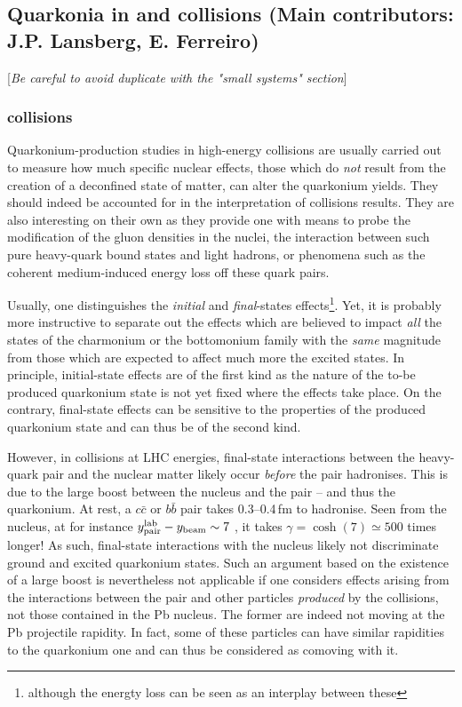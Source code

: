 \documentclass[../report.tex]{subfiles}
\begin{document}

\clearpage

\subsection{Quarkonia in \pPb and \pp collisions (Main contributors: J.P. Lansberg, E. Ferreiro)}

[{\it Be careful to avoid duplicate with the "small systems" section}]


\subsubsection{\pPb collisions}
 Quarkonium-production studies in high-energy \pPb collisions are usually carried out to measure how much specific nuclear effects, those which do {\it not} result from the creation of a deconfined state of matter, can alter the quarkonium yields. They should indeed be accounted for in the interpretation of  \PbPb collisions results. They are also interesting on their own as they provide one with means to probe the modification of the gluon densities in the nuclei, the interaction between such pure heavy-quark bound states and light hadrons, or phenomena such as the coherent medium-induced energy loss off these quark pairs.
 
 Usually, one distinguishes the {\it initial} and {\it final}-states effects\footnote{although the energty loss can be seen as an interplay between these}. Yet, it is probably more instructive to separate out the effects which are believed to impact {\it all} the states of the charmonium or the bottomonium family with the {\it same} magnitude from those which are expected to affect much more the excited states. In principle, initial-state effects are of the first kind as the nature of the to-be produced quarkonium state is not yet fixed where the effects take place.  On the contrary, final-state effects can be sensitive to the properties of the produced quarkonium state and can thus be of the second kind.
 
However, in \pPb collisions at LHC energies, final-state interactions between the heavy-quark pair and the nuclear matter likely occur {\it before} the pair hadronises. This is due to the large boost between the nucleus and the pair -- and thus the quarkonium. At rest, a $c \bar c$ or $b\bar b$ pair takes 0.3--0.4\,fm to hadronise. Seen from the nucleus, at for instance $y^{\rm lab}_{\rm pair}-y_{\rm beam} \sim 7$ , it takes $\gamma=\cosh(7) \simeq 500$ times longer! As such, final-state interactions with the nucleus likely not discriminate ground and excited quarkonium states. Such an argument based on the existence of a large boost is nevertheless not applicable if one considers effects arising from the interactions between the pair and other particles {\it produced} by the \pPb collisions, not those contained in the Pb nucleus. The former are indeed not moving at the Pb projectile rapidity. In fact, some of these particles can have similar rapidities to the quarkonium one and can thus be considered as comoving with it.
 
\end{document}

